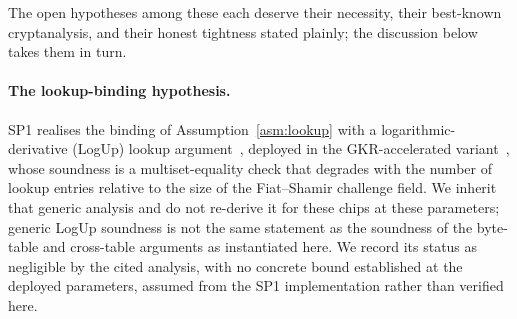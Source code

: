 The open hypotheses among these each deserve their necessity, their best-known cryptanalysis, and their honest tightness stated plainly; the discussion below takes them in turn.

\paragraph{The lookup-binding hypothesis.}
SP1 realises the binding of Assumption~\ref{asm:lookup} with a logarithmic-derivative (LogUp) lookup argument~\cite{haback2022logup}, deployed in the GKR-accelerated variant~\cite{papini2023logupgkr}, whose soundness is a multiset-equality check that degrades with the number of lookup entries relative to the size of the Fiat--Shamir challenge field. We inherit that generic analysis and do not re-derive it for these chips at these parameters; generic LogUp soundness is not the same statement as the soundness of the byte-table and cross-table arguments as instantiated here. We record its status as negligible by the cited analysis, with no concrete bound established at the deployed parameters, assumed from the SP1 implementation rather than verified here.

